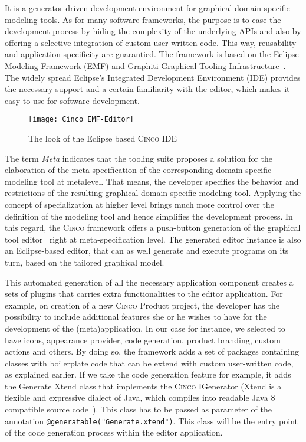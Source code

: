It is a generator-driven development environment for graphical domain-specific modeling tools. As for many software frameworks, the purpose is to ease the development process by hiding the complexity of the underlying APIs and also by offering a selective integration of custom user-written code. This way, reusability and application specificity are guarantied. The framework is based on the Eclipse Modeling Framework (EMF) and Graphiti Graphical Tooling Infrastructure~\cite{Cinco}. The widely spread Eclipse's Integrated Development Environment (IDE) provides the necessary support and a certain familiarity with the editor, which makes it easy to use for software development.
\begin{figure}[h]
    \centering
    \texttt{[image: Cinco\_EMF-Editor]}
    \caption{The look of the Eclipse based \textsc{Cinco} IDE}
\end{figure}

The term \textit{Meta} indicates that the tooling suite proposes a solution for the elaboration of the meta-specification of the corresponding domain-specific modeling tool at metalevel. That means, the developer specifies the behavior and restrictions of the resulting graphical domain-specific modeling tool. Applying the concept of specialization at higher level brings much more control over the definition of the modeling tool and hence simplifies the development process. In this regard, the \textsc{Cinco} framework offers a push-button generation of the graphical tool editor~\cite{scce} right at meta-specification level. The generated editor instance is also an Eclipse-based editor, that can as well generate and execute programs on its turn, based on the tailored graphical model.

This automated generation of all the necessary application component creates a sets of plugins that carries extra functionalities to the editor application. For example, on creation of a new \textsc{Cinco} Product project, the developer has the possibility to include additional features she or he wishes to have for the development of the (meta)application. In our case for instance, we selected to have icons, appearance provider, code generation, product branding, custom actions and others. By doing so, the framework adds a set of packages containing classes with boilerplate code that can be extend with custom user-written code, as explained earlier. If we take the code generation feature for example, it adds the Generate Xtend class that implements the \textsc{Cinco} IGenerator (Xtend is a flexible and expressive dialect of Java, which compiles into readable Java 8 compatible source code~\cite{Xtend}). This class has to be passed as parameter of the annotation \lstinline[language=MGL]{@generatable("Generate.xtend")}. This class will be the entry point of the code generation process within the editor application.


